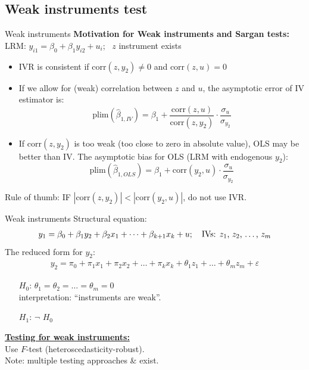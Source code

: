 \documentclass[usenames,dvipsnames]{beamer}
\begin{document}
\subsection{Weak instruments test}
\begin{frame}{Weak instruments}
\textbf{Motivation for Weak instruments and Sargan tests:} \\
\medskip
LRM: \quad $y_{i1}=\beta_0+\beta_1 y_{i2}+u_i$; \ $z$ instrument exists
\bigskip
\begin{itemize}
\item IVR is consistent if $\mathrm{corr}(z,y_2) \neq 0$ and $\mathrm{corr}(z, u) = 0$
\item If we allow for (weak) correlation between $z$ and $u$, the asymptotic error of IV estimator is:
\small $$\mathrm{plim}(\hat{\beta}_{1, IV}) = \beta_1 + \frac{\mathrm{corr}(z,u)}{\mathrm{corr}(z,y_2)} \cdot \frac{\sigma_u}{\sigma_{y_2}} $$
\item If $\mathrm{corr}(z, y_2)$ is too weak (too close to zero in absolute value), OLS may be better than IV. The asymptotic bias for OLS (LRM with endogenous $y_2$):
\small $$\mathrm{plim}(\hat{\beta}_{1,OLS})=\beta_1+\mathrm{corr}(y_2,u) \cdot \frac{\sigma_u}{\sigma_{y_2}}$$
\end{itemize}
Rule of thumb: IF $|\mathrm{corr}(z,y_2)| < |\mathrm{corr}(y_2,u)|$, do not use IVR.
\end{frame}
\begin{frame}{Weak instruments}
Structural equation: 
\begin{align*}
y_1=\beta_0+\beta_1 y_2 + \beta_2 x_1 + \dots + \beta_{k+1} x_k + u; \quad \text{IVs: $z_1$, $z_2$, \dots , $z_m$}
\end{align*}
The reduced form for $y_2$: 
\begin{align*}
y_2=\pi_0 + \pi_1 x_1 + \pi_2 x_2 + \dots + \pi_k x_k + \theta_1 z_1 + \dots + \theta_m z_m + \varepsilon
\end{align*}
\vspace{-0.3cm}
\begin{itemize}
\item[$H_0$:] $\theta_1=\theta_2=\dots=\theta_m=0$ \\interpretation: ``instruments are weak''.
\item[$H_1$:] $\neg$ $H_0$
\end{itemize}
\bigskip
\textbf{\underline{Testing for weak instruments:}} \\
\medskip
Use $F$-test (heteroscedasticity-robust). \\Note: multiple testing approaches \& exist.
\end{frame}
\end{document}
